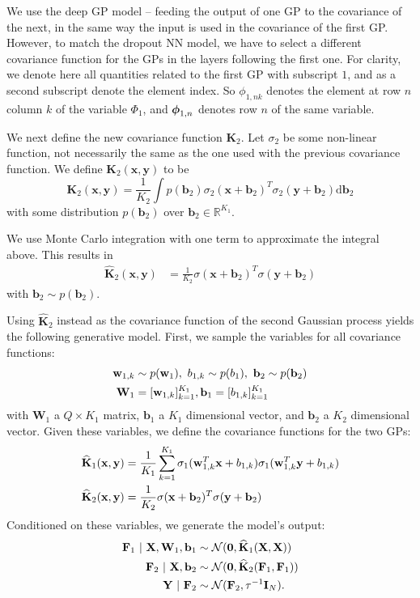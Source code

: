 \documentclass{article} %
\newcommand{\R}{\mathbb{R}}
\newcommand{\N}{\mathcal{N}}
\newcommand{\svert}{~|~}
\newcommand{\td}{\text{d}}
\newcommand{\x}{\mathbf{x}}
\newcommand{\Bb}{\mathbf{b}}
\newcommand{\y}{\mathbf{y}}
\newcommand{\w}{\mathbf{w}}
\newcommand{\W}{\mathbf{W}}
\newcommand{\X}{\mathbf{X}}
\newcommand{\Y}{\mathbf{Y}}
\newcommand{\F}{\mathbf{F}}
\newcommand{\I}{\mathbf{I}}
\newcommand{\bz}{\mathbf{0}}
\newcommand{\bphi}{\text{\boldmath$\phi$}}
\newcommand{\K}{\mathbf{K}}
\newcommand{\Kh}{\widehat{\mathbf{K}}}
\theoremstyle{definition}
\begin{document}
We use the deep GP model -- feeding the output of one GP to the covariance of the next, in the same way the input is used in the covariance of the first GP.
However, to match the dropout NN model, we have to select a different covariance function for the GPs in the layers following the first one. For clarity, we denote here all quantities related to the first GP with subscript $1$, and as a second subscript denote the element index. So $\phi_{1,nk}$ denotes the element at row $n$ column $k$ of the variable $\Phi_1$, and $\bphi_{1,n}$ denotes row $n$ of the same variable.

We next define the new covariance function $\K_2$. Let $\sigma_2$ be some non-linear function, not necessarily the same as the one used with the previous covariance function. We define $\K_2(\x, \y)$ to be 
$$
\K_2(\x, \y) = \frac{1}{K_2} \int p(\Bb_2) \sigma_2(\x + \Bb_2)^T \sigma_2(\y + \Bb_2) \td \Bb_2
$$
with some distribution $p(\Bb_2)$ over $\Bb_2 \in \R^{K_1}$.

We use Monte Carlo integration with one term to approximate the integral above. This results in 
\begin{align*}
\Kh_2(\x, \y) &= 
\frac{1}{K_2} 
 \sigma(\x + \Bb_2)^T \sigma(\y + \Bb_2)
\end{align*}
with $\Bb_2 \sim p(\Bb_2)$.

Using $\Kh_2$ instead as the covariance function of the second Gaussian process yields the following generative model. First, we sample the variables for all covariance functions:
\begin{align*}
\w_{1,k} &\sim p(\w_1), 
~b_{1,k} \sim p(b_1), 
~\Bb_2 \sim p(\Bb_2) \notag\\
\W_1 &= [\w_{1,k}]_{k=1}^{K_1}, \Bb_1 = [b_{1,k}]_{k=1}^{K_1}
\end{align*}
with $\W_1$ a $Q \times K_1$ matrix, $\Bb_1$ a $K_1$ dimensional vector, and $\Bb_2$ a $K_2$ dimensional vector.
Given these variables, we define the covariance functions for the two GPs:
\begin{align*}
\Kh_1(\x, \y) &= \frac{1}{K_1} \sum_{k=1}^{K_1} 
 \sigma_1(\w_{1,k}^T \x + b_{1,k}) \sigma_1(\w_{1,k}^T \y + b_{1,k}) \notag\\
\Kh_2(\x, \y) &= \frac{1}{K_2} 
 \sigma(\x + \Bb_2)^T \sigma(\y + \Bb_2)
\end{align*}
Conditioned on these variables, we generate the model's output:
\begin{align*}
\F_1 \svert \X, \W_1, \Bb_1 &\sim \N(\bz, \Kh_1(\X, \X)) \notag\\
\F_2 \svert \X, \Bb_2 &\sim \N(\bz, \Kh_2(\F_1, \F_1)) \notag\\
\Y \svert \F_2 &\sim \N(\F_2, \tau^{-1} \I_N).
\end{align*}
\end{document}

